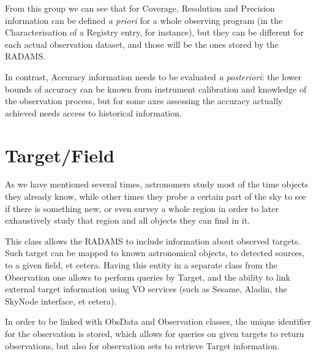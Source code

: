 		From this group we can see that for Coverage, Resolution and
		Precision information can be defined
		\emph{a priori} for a whole observing program (in the
		Characterisation of a Registry entry, for instance), but they
		can be different for each actual observation dataset, and
		those will be the ones stored by the RADAMS.
		
		In contrast, Accuracy information needs to
		be evaluated \emph{a posteriori}: the lower bounds of 
		accuracy can be known from instrument calibration and
		knowledge of the observation process, but for some axes
		assessing the accuracy actually achieved needs access to
		historical information.
		
		
		
			
			
		
	
	\section{Target/Field} %
	\label{sec:radams_target}
		
		As we have mentioned several times, astronomers study most
		of the time objects they already know, while other times
		they probe a certain part of the sky to see if there is
		something new, or even survey a whole region in order to 
		later exhaustively study that region and all objects they
		can find in it.
		
		This class allows the RADAMS to include information 
		about observed targets. Such target can be mapped to
		known astronomical objects, to detected sources, to a given
		field, et cetera. Having this entity in a separate class from
		the Observation one allows to perform queries by Target, and
		the ability to link external target information using VO
		services (such as Sesame, Aladin, the SkyNode interface,
		et cetera).
		
		In order to be linked with ObsData and Observation
		classes, the unique identifier for the observation is
		stored, which allows for queries on given targets to
		return observations, but also for observation sets to
		retrieve Target information.
		

